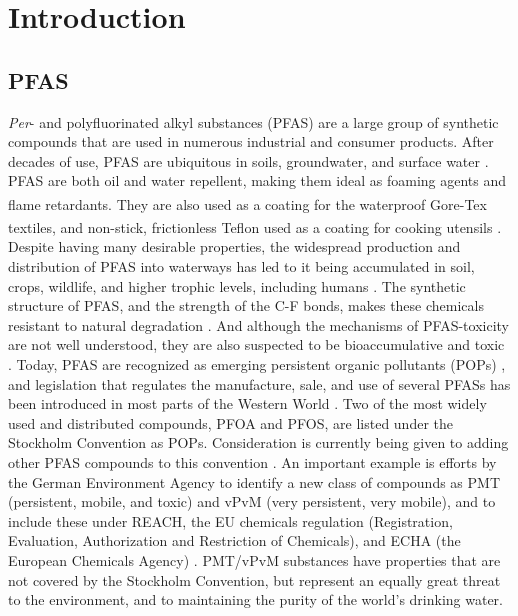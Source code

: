 \chapter{Introduction}\label{chap:intro}

\section{PFAS}
\textit{Per}- and polyfluorinated alkyl substances (PFAS) are a large group of synthetic compounds that are used in numerous industrial and consumer products. After decades of use, PFAS are ubiquitous in soils, groundwater, and surface water \citep{rankin2016north}. PFAS are both oil and water repellent, making them ideal as foaming agents and flame retardants. They are also used as a coating for the waterproof Gore-Tex\textsuperscript{\textregistered} textiles, and non-stick, frictionless Teflon\textsuperscript{\texttrademark} used as a coating for cooking utensils \citep{du2014adsorption}. Despite having many desirable properties, the widespread production and distribution of PFAS into waterways has led to it being accumulated in soil, crops, wildlife, and higher trophic levels, including humans \citep{bhhatarai2011,Lau2007}. The synthetic structure of PFAS, and the strength of the C-F bonds, makes these chemicals resistant to natural degradation \citep{krafft2015per}. And although the mechanisms of PFAS-toxicity are not well understood, they are also suspected to be bioaccumulative and toxic \citep{ding2013physicochemical,Lau2007}. Today, PFAS are recognized as emerging persistent organic pollutants (POPs) \citep{ECHA2020}, and legislation that regulates the manufacture, sale, and use of several PFASs has been introduced in most parts of the Western World \citep{EPA2014,EC2020PFAS}. Two of the most widely used and distributed compounds, PFOA and PFOS, are listed under the Stockholm Convention as \acrshort{POPs}. Consideration is currently being given to adding other PFAS compounds to this convention \citep{EC2020PFAS}. An important example is efforts by the German Environment Agency to identify a new class of compounds as PMT (persistent, mobile, and toxic) and vPvM (very persistent, very mobile), and to include these under REACH, the EU chemicals regulation (Registration, Evaluation, Authorization and Restriction of Chemicals), and ECHA (the European Chemicals Agency) \citep{hale2020persistent}. \acrshort{PMT}/\acrshort{vPvM} substances have properties that are not covered by the Stockholm Convention, but represent an equally great threat to the environment, and to maintaining the purity of the world's drinking water.

